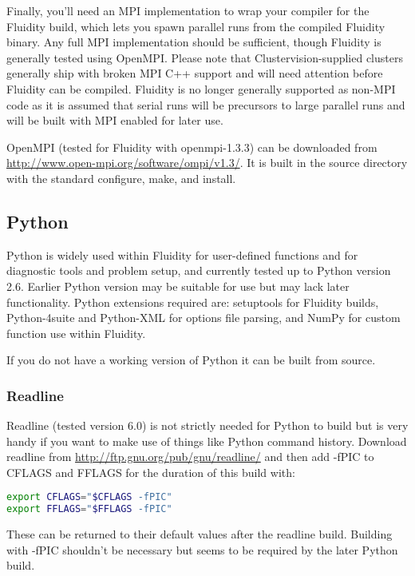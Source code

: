 Finally, you'll need an MPI implementation to wrap your compiler for the
Fluidity build, which lets you spawn parallel runs from the compiled Fluidity
binary. Any full MPI implementation should be sufficient, though Fluidity is
generally tested using OpenMPI. Please note that Clustervision-supplied
clusters generally ship with broken MPI C++ support and will need attention
before Fluidity can be compiled. Fluidity is no longer generally supported as
non-MPI code as it is assumed that serial runs will be precursors to large
parallel runs and will be built with MPI enabled for later use.

OpenMPI (tested for Fluidity with openmpi-1.3.3) can be downloaded from
\url{http://www.open-mpi.org/software/ompi/v1.3/}. It is built in the source
directory with the standard configure, make, and install.

\subsection{Python}
\label{sect:required_libraries_python}

Python is widely used within Fluidity for user-defined functions and for
diagnostic tools and problem setup, and currently tested up to Python version
2.6. Earlier Python version may be suitable for use but may lack later
functionality. Python extensions required are: setuptools for Fluidity builds,
Python-4suite and Python-XML for options file parsing, and NumPy for custom
function use within Fluidity.

If you do not have a working version of Python it can be built from source. 

\subsubsection{Readline}
\label{sect:required_libraries_python_readline}

Readline (tested version 6.0) is not strictly needed for Python to build but is
very handy if you want to make use of things like Python command history.
Download readline from \url{http://ftp.gnu.org/pub/gnu/readline/} and then add
-fPIC to CFLAGS and FFLAGS for the duration of this build with:

\begin{lstlisting}[language=bash]
export CFLAGS="$CFLAGS -fPIC"
export FFLAGS="$FFLAGS -fPIC"
\end{lstlisting}

These can be returned to their default values after the readline build.
Building with -fPIC shouldn't be necessary but seems to be required by the
later Python build.


